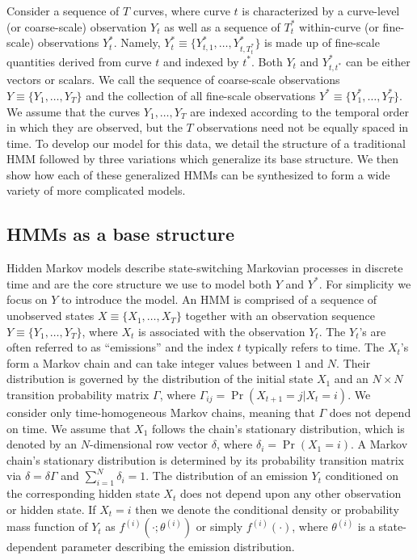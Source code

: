 
Consider a sequence of $T$ curves, where curve $t$ is characterized by a curve-level (or coarse-scale) observation $Y_t$ as well as a sequence of $T^*_t$ within-curve (or fine-scale) observations $Y^*_{t}$. Namely, $Y^*_{t} \equiv \big\{Y^*_{t,1},\ldots,Y^*_{t,T^*_t}\big\}$ is made up of fine-scale quantities derived from curve $t$ and indexed by $t^*$. Both $Y_t$ and $Y^*_{t,t^*}$ can be either vectors or scalars. We call the sequence of coarse-scale observations $Y \equiv \big\{Y_1, \ldots, Y_T\big\}$ and the collection of all fine-scale observations $Y^* \equiv \big\{Y^*_1,\ldots,Y^*_T \big\}$. We assume that the curves $Y_1,\ldots,Y_T$ are indexed according to the temporal order in which they are observed, but the $T$ observations need not be equally spaced in time. To develop our model for this data, we detail the structure of a traditional HMM followed by three variations which generalize its base structure. We then show how each of these generalized HMMs can be synthesized to form a wide variety of more complicated models.

\subsection{HMMs as a base structure}
\label{subsec:HMM}

Hidden Markov models describe state-switching Markovian processes in discrete time and are the core structure we use to model both $Y$ and $Y^*$. For simplicity we focus on $Y$ to introduce the model. An HMM is comprised of a sequence of unobserved states $X \equiv \big\{X_1, \ldots, X_T\big\}$ together with an observation sequence $Y \equiv \big\{Y_1, \ldots, Y_T\big\}$, where $X_t$ is associated with the observation $Y_t$. The $Y_t$'s are often referred to as ``emissions'' and the index $t$ typically refers to time. 
The $X_t$'s form a Markov chain and can take integer values between $1$ and $N$. Their distribution is governed by the distribution of the initial state $X_1$ and an $N \times N$ transition probability matrix $\Gamma$, where $\Gamma_{ij} = \Pr(X_{t+1} = j | X_t = i)$. We consider only time-homogeneous Markov chains, meaning that $\Gamma$ does not depend on time.
%
We assume that $X_1$ follows the chain's stationary distribution, which is denoted by an $N$-dimensional row vector $\delta$, where
$\delta_i = \Pr(X_1 = i).$
A Markov chain's stationary distribution is determined by its probability transition matrix via $\delta = \delta \Gamma$ and $\sum_{i=1}^N \delta_i = 1$.
%
The distribution of an emission $Y_t$ conditioned on the corresponding hidden state $X_t$ does not depend upon any other observation or hidden state.
%
If $X_t=i$ then we denote the conditional density or probability mass function of $Y_t$ as $f^{(i)}(\cdot ; \theta^{(i)})$ or simply $f^{(i)}(\cdot)$, where $\theta^{(i)}$ is a state-dependent parameter describing the emission distribution.
%

